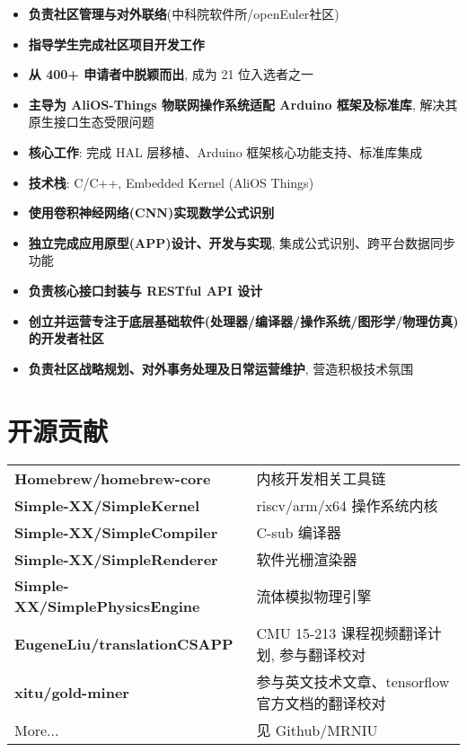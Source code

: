\documentclass{resume}
\begin{document}
\begin{itemize}
  \item \textbf{负责社区管理与对外联络}(中科院软件所/openEuler社区)
  \item \textbf{指导学生完成社区项目开发工作}
\end{itemize}

\begin{itemize}
  \item \textbf{从 400+ 申请者中脱颖而出}, 成为 21 位入选者之一
  \item \textbf{主导为 AliOS-Things 物联网操作系统适配 Arduino 框架及标准库}, 解决其原生接口生态受限问题
  \item \textbf{核心工作}: 完成 HAL 层移植、Arduino 框架核心功能支持、标准库集成
  \item \textbf{技术栈}: C/C++, Embedded Kernel (AliOS Things)
\end{itemize}

\begin{itemize}
  \item \textbf{使用卷积神经网络(CNN)实现数学公式识别}
  \item \textbf{独立完成应用原型(APP)设计、开发与实现}, 集成公式识别、跨平台数据同步功能
  \item \textbf{负责核心接口封装与 RESTful API 设计}
\end{itemize}

\begin{itemize}
  \item \textbf{创立并运营专注于底层基础软件(处理器/编译器/操作系统/图形学/物理仿真)的开发者社区}
  \item \textbf{负责社区战略规划、对外事务处理及日常运营维护}, 营造积极技术氛围
\end{itemize}

\section{开源贡献}
\begin{tabular}{ll}
  \textbf{Homebrew/homebrew-core} & 内核开发相关工具链 \\
  \textbf{Simple-XX/SimpleKernel} & riscv/arm/x64 操作系统内核 \\
  \textbf{Simple-XX/SimpleCompiler} & C-sub 编译器 \\
  \textbf{Simple-XX/SimpleRenderer} & 软件光栅渲染器 \\
  \textbf{Simple-XX/SimplePhysicsEngine} & 流体模拟物理引擎 \\
  \textbf{EugeneLiu/translationCSAPP} & CMU 15-213 课程视频翻译计划, 参与翻译校对 \\
  \textbf{xitu/gold-miner} & 参与英文技术文章、tensorflow 官方文档的翻译校对 \\
  More... & 见 Github/MRNIU
\end{tabular}
\sectionsep
\end{document}
